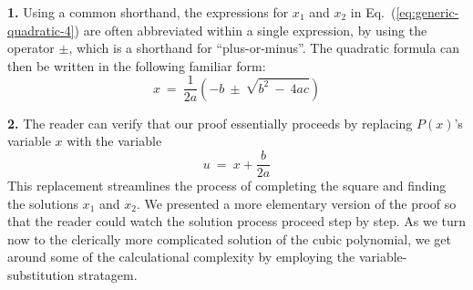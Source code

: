 
\smallskip

{\bf 1.}
Using a common shorthand, the expressions for $x_1$ and $x_2$ in Eq.~(\ref{eq:generic-quadratic-4}) are often abbreviated within a single expression, by using the operator $\pm$, which is a shorthand for ``plus-or-minus''.  The quadratic formula can then be written in the following familiar form:
\[
x \ = \  \frac{1}{2a} \left( -b \ \pm \ \sqrt{b^2 \ - \ 4ac} \right)
\]

\smallskip

{\bf 2.}
The reader can verify that our proof essentially proceeds by replacing $P(x)$'s variable $x$ with the variable
\[ u \ = \ x + \frac{b}{2a} \]
This replacement streamlines the process of completing the square and finding the solutions $x_1$ and $x_2$.  We presented a more elementary version of the proof so that the reader could watch the solution process proceed step by step.  As we turn now to the clerically more complicated solution of the cubic polynomial, we get around some of the calculational complexity by employing the variable-substitution stratagem.

\smallskip

